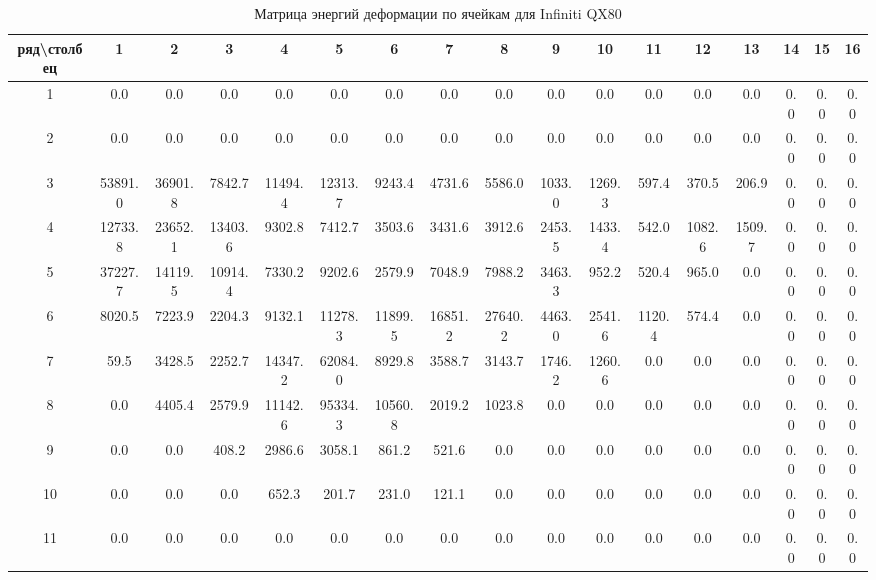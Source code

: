 \begin{table}[h]
\centering
\footnotesize
\caption{Матрица энергий деформации по ячейкам для Infiniti QX80}
\begin{tabular}{c|cccccccccccccccc}
\hline
ряд\textbackslash столбец & 1 & 2 & 3 & 4 & 5 & 6 & 7 & 8 & 9 & 10 & 11 & 12 & 13 & 14 & 15 & 16 \\
\hline
1 & 0.0 & 0.0 & 0.0 & 0.0 & 0.0 & 0.0 & 0.0 & 0.0 & 0.0 & 0.0 & 0.0 & 0.0 & 0.0 & 0.0 & 0.0 & 0.0 \\
2 & 0.0 & 0.0 & 0.0 & 0.0 & 0.0 & 0.0 & 0.0 & 0.0 & 0.0 & 0.0 & 0.0 & 0.0 & 0.0 & 0.0 & 0.0 & 0.0 \\
3 & 53891.0 & 36901.8 & 7842.7 & 11494.4 & 12313.7 & 9243.4 & 4731.6 & 5586.0 & 1033.0 & 1269.3 & 597.4 & 370.5 & 206.9 & 0.0 & 0.0 & 0.0 \\
4 & 12733.8 & 23652.1 & 13403.6 & 9302.8 & 7412.7 & 3503.6 & 3431.6 & 3912.6 & 2453.5 & 1433.4 & 542.0 & 1082.6 & 1509.7 & 0.0 & 0.0 & 0.0 \\
5 & 37227.7 & 14119.5 & 10914.4 & 7330.2 & 9202.6 & 2579.9 & 7048.9 & 7988.2 & 3463.3 & 952.2 & 520.4 & 965.0 & 0.0 & 0.0 & 0.0 & 0.0 \\
6 & 8020.5 & 7223.9 & 2204.3 & 9132.1 & 11278.3 & 11899.5 & 16851.2 & 27640.2 & 4463.0 & 2541.6 & 1120.4 & 574.4 & 0.0 & 0.0 & 0.0 & 0.0 \\
7 & 59.5 & 3428.5 & 2252.7 & 14347.2 & 62084.0 & 8929.8 & 3588.7 & 3143.7 & 1746.2 & 1260.6 & 0.0 & 0.0 & 0.0 & 0.0 & 0.0 & 0.0 \\
8 & 0.0 & 4405.4 & 2579.9 & 11142.6 & 95334.3 & 10560.8 & 2019.2 & 1023.8 & 0.0 & 0.0 & 0.0 & 0.0 & 0.0 & 0.0 & 0.0 & 0.0 \\
9 & 0.0 & 0.0 & 408.2 & 2986.6 & 3058.1 & 861.2 & 521.6 & 0.0 & 0.0 & 0.0 & 0.0 & 0.0 & 0.0 & 0.0 & 0.0 & 0.0 \\
10 & 0.0 & 0.0 & 0.0 & 652.3 & 201.7 & 231.0 & 121.1 & 0.0 & 0.0 & 0.0 & 0.0 & 0.0 & 0.0 & 0.0 & 0.0 & 0.0 \\
11 & 0.0 & 0.0 & 0.0 & 0.0 & 0.0 & 0.0 & 0.0 & 0.0 & 0.0 & 0.0 & 0.0 & 0.0 & 0.0 & 0.0 & 0.0 & 0.0 \\
\hline
\end{tabular}
\label{tab:E_infiniti_cells}
\end{table}
